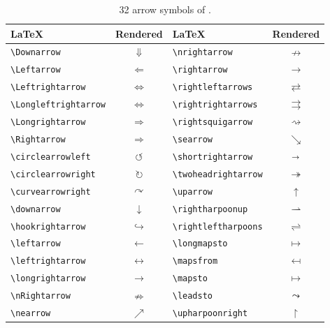 \begin{table}[ht]
        \centering

            \begin{tabular}{lc|lc}
                \toprule
                \LaTeX & Rendered & \LaTeX & Rendered \\
                \midrule
\verb+\Downarrow+ & $\Downarrow$ &\verb+\nrightarrow+ & $\nrightarrow$\\
\verb+\Leftarrow+ & $\Leftarrow$ &\verb+\rightarrow+ & $\rightarrow$\\
\verb+\Leftrightarrow+ & $\Leftrightarrow$ &\verb+\rightleftarrows+ & $\rightleftarrows$\\
\verb+\Longleftrightarrow+ & $\Longleftrightarrow$ &\verb+\rightrightarrows+ & $\rightrightarrows$\\
\verb+\Longrightarrow+ & $\Longrightarrow$ &\verb+\rightsquigarrow+ & $\rightsquigarrow$\\
\verb+\Rightarrow+ & $\Rightarrow$ &\verb+\searrow+ & $\searrow$\\
\verb+\circlearrowleft+ & $\circlearrowleft$ &\verb+\shortrightarrow+ & $\shortrightarrow$\\
\verb+\circlearrowright+ & $\circlearrowright$ &\verb+\twoheadrightarrow+ & $\twoheadrightarrow$\\
\verb+\curvearrowright+ & $\curvearrowright$ &\verb+\uparrow+ & $\uparrow$\\
\verb+\downarrow+ & $\downarrow$ &\verb+\rightharpoonup+ & $\rightharpoonup$\\
\verb+\hookrightarrow+ & $\hookrightarrow$ &\verb+\rightleftharpoons+ & $\rightleftharpoons$\\
\verb+\leftarrow+ & $\leftarrow$ &\verb+\longmapsto+ & $\longmapsto$\\
\verb+\leftrightarrow+ & $\leftrightarrow$ &\verb+\mapsfrom+ & $\mapsfrom$\\
\verb+\longrightarrow+ & $\longrightarrow$ &\verb+\mapsto+ & $\mapsto$\\
\verb+\nRightarrow+ & $\nRightarrow$ &\verb+\leadsto+ & $\leadsto$\\
\verb+\nearrow+ & $\nearrow$ &\verb+\upharpoonright+ & $\upharpoonright$\\

        \bottomrule
    \end{tabular}

    \caption{32 arrow symbols of \dbName.}
    \label{table:symbols-of-db-3}
\end{table}



